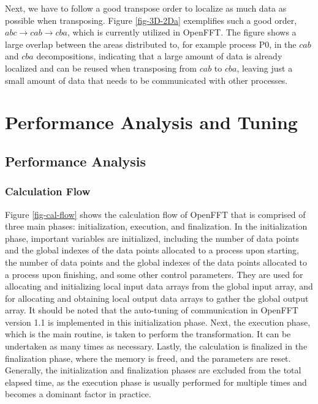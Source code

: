 Next, we have to follow a good transpose order to localize as much data as possible when transposing. Figure \ref{fig-3D-2Da} exemplifies such a good order, $abc \rightarrow cab \rightarrow cba$, which is currently utilized in OpenFFT. The figure shows a large overlap between the areas distributed to, for example process P0, in the $cab$ and $cba$ decompositions, indicating that a large amount of data is already localized and can be reused when transposing from $cab$ to $cba$, leaving just a small amount of data that needs to be communicated with other processes.



\section{Performance Analysis and Tuning}

\subsection{Performance Analysis}

\subsubsection{Calculation Flow}

Figure \ref{fig-cal-flow} shows the calculation flow of OpenFFT that is comprised of three main phases: initialization, execution, and finalization. In the initialization phase, important variables are initialized, including the number of data points and the global indexes of the data points allocated to a process upon starting, the number of data points and the global indexes of the data points allocated to a process upon finishing, and some other control parameters. They are used for allocating and initializing local input data arrays from the global input array, and for allocating and obtaining local output data arrays to gather the global output array. It should be noted that the auto-tuning of communication in OpenFFT version 1.1 is implemented in this initialization phase.  Next, the execution phase, which is the main routine, is taken to perform the transformation. It can be undertaken as many times as necessary. Lastly, the calculation is finalized in the finalization phase, where the memory is freed, and the parameters are reset. Generally, the initialization and finalization phases are excluded from the total elapsed time, as the execution phase is usually performed for multiple times and becomes a dominant factor in practice. 

